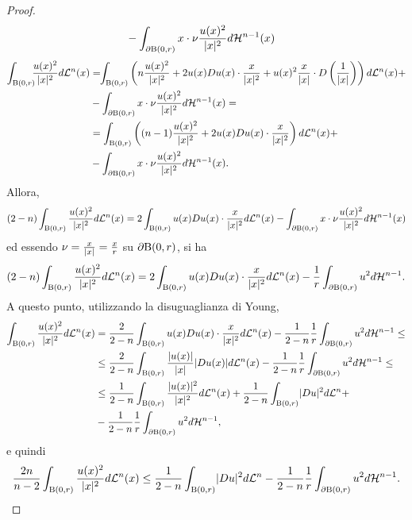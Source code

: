 \begin{proof}
\begin{align*}
		&- \int_{\partial \textup{B}(0,r)}x \cdot \nu \frac{u(x)^2}{\lvert x\rvert^2}d\mathcal{H}^{n-1}(x)
	\end{align*}
	\begin{align*}
		\int_{\textup{B}(0,r)}\!\!\!\frac{u(x)^2}{\lvert x\rvert^2} d\mathcal{L}^n(x) &= \!\!\int_{\textup{B}(0,r)} \left( n\frac{u(x)^2}{\lvert x\rvert^2} + 2u(x)Du(x) \cdot \frac{x}{\lvert x\rvert^2} + u(x)^2 \frac{x}{\lvert x\rvert}\cdot D\left( \frac{1}{\lvert x\rvert}\right)\right) d\mathcal{L}^n(x) + \\
		&- \int_{\partial \textup{B}(0,r)}x \cdot \nu \frac{u(x)^2}{\lvert x\rvert^2} d\mathcal{H}^{n-1}(x) = \\
		&= \int_{\textup{B}(0,r)} \left( (n-1)\frac{u(x)^2}{\lvert x\rvert^2} + 2u(x)Du(x) \cdot \frac{x}{\lvert x\rvert^2}\right)  d\mathcal{L}^n(x)+ \\
		&- \int_{\partial \textup{B}(0,r)}x \cdot \nu \frac{u(x)^2}{\lvert x\rvert^2} d\mathcal{H}^{n-1}(x).
	\end{align*}
	Allora, 
	\[ (2-n)\int_{\textup{B}(0,r)}\frac{u(x)^2}{\lvert x\rvert^2} d\mathcal{L}^n(x) = 2\int_{\textup{B}(0,r)}u(x)Du(x) \cdot \frac{x}{\lvert x\rvert^2}  d\mathcal{L}^n(x)  - \int_{\partial \textup{B}(0,r)}x \cdot \nu \frac{u(x)^2}{\lvert x\rvert^2} d\mathcal{H}^{n-1}(x) \]
	ed essendo $\nu = \frac{x}{\lvert x\rvert} = \frac{x}{r}$ su $\partial \textup{B}(0,r)$, si ha
	\[ (2-n)\int_{\textup{B}(0,r)}\frac{u(x)^2}{\lvert x\rvert^2} d\mathcal{L}^n(x) = 2\int_{\textup{B}(0,r)}u(x)Du(x) \cdot \frac{x}{\lvert x\rvert^2}  d\mathcal{L}^n(x)  - \frac{1}{r}\int_{\partial \textup{B}(0,r)}u^2 d\mathcal{H}^{n-1}. \]
	A questo punto, utilizzando la disuguaglianza di Young,
	\begin{align*}
		\int_{\textup{B}(0,r)}\frac{u(x)^2}{\lvert x\rvert^2} d\mathcal{L}^n(x) &= \frac{2}{2-n}\int_{\textup{B}(0,r)}u(x)Du(x) \cdot \frac{x}{\lvert x\rvert^2}  d\mathcal{L}^n(x)  - \frac{1}{2-n}\frac{1}{r}\int_{\partial \textup{B}(0,r)}u^2 d\mathcal{H}^{n-1} \le \\
		&\le \frac{2}{2-n}\int_{\textup{B}(0,r)}\frac{\lvert u(x)\rvert}{\lvert x\rvert}\lvert Du(x)\rvert d\mathcal{L}^n(x)  - \frac{1}{2-n}\frac{1}{r}\int_{\partial \textup{B}(0,r)}u^2 d\mathcal{H}^{n-1} \le \\
		&\le\frac{1}{2-n}\int_{\textup{B}(0,r)}\frac{\lvert u(x)\rvert^2}{\lvert x\rvert^2} d\mathcal{L}^n(x) + \frac{1}{2-n}\int_{\textup{B}(0,r)}\lvert Du\rvert^2 d\mathcal{L}^n +\\
		&-\frac{1}{2-n}\frac{1}{r}\int_{\partial \textup{B}(0,r)}u^2 d\mathcal{H}^{n-1},
	\end{align*}
	e quindi
	\[ \frac{2n}{n-2}\int_{\textup{B}(0,r)}\frac{u(x)^2}{\lvert x\rvert^2} d\mathcal{L}^n(x) \le \frac{1}{2-n}\int_{\textup{B}(0,r)}\lvert Du\rvert^2 d\mathcal{L}^n -\frac{1}{2-n}\frac{1}{r}\int_{\partial \textup{B}(0,r)}u^2 d\mathcal{H}^{n-1}. \]

\end{proof}
